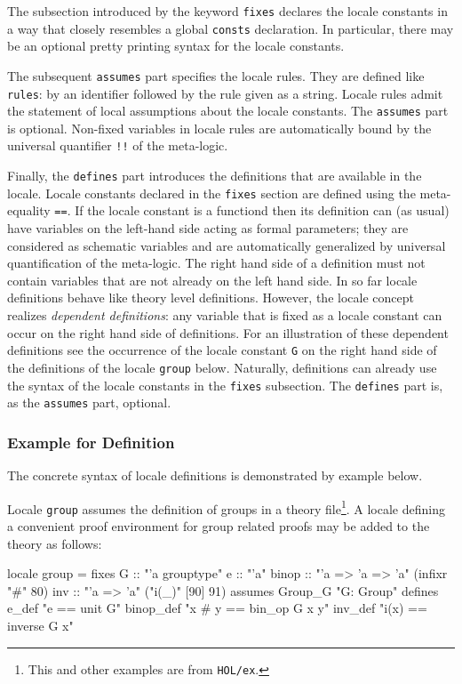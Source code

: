 The subsection introduced by the keyword \texttt{fixes} declares the locale
constants in a way that closely resembles a global \texttt{consts}
declaration.  In particular, there may be an optional pretty printing syntax
for the locale constants.

The subsequent \texttt{assumes} part specifies the locale rules.  They are
defined like \texttt{rules}: by an identifier followed by the rule
given as a string.  Locale rules admit the statement of local assumptions
about the locale constants.  The \texttt{assumes} part is optional.  Non-fixed
variables in locale rules are automatically bound by the universal quantifier
\texttt{!!} of the meta-logic.

Finally, the \texttt{defines} part introduces the definitions that are
available in the locale.  Locale constants declared in the \texttt{fixes}
section are defined using the meta-equality \texttt{==}.  If the
locale constant is a functiond then its definition can (as usual) have
variables on the left-hand side acting as formal parameters; they are
considered as schematic variables and are automatically generalized by
universal quantification of the meta-logic.  The right hand side of a
definition must not contain variables that are not already on the left hand
side.  In so far locale definitions behave like theory level definitions.
However, the locale concept realizes \emph{dependent definitions}: any variable
that is fixed as a locale constant can occur on the right hand side of
definitions.  For an illustration of these dependent definitions see the
occurrence of the locale constant \texttt{G} on the right hand side of the
definitions of the locale \texttt{group} below.  Naturally, definitions can
already use the syntax of the locale constants in the \texttt{fixes}
subsection.  The \texttt{defines} part is, as the \texttt{assumes} part,
optional.

\subsubsection{Example for Definition}
The concrete syntax of locale definitions is demonstrated by example below.

Locale \texttt{group} assumes the definition of groups in a theory
file\footnote{This and other examples are from \texttt{HOL/ex}.}.  A locale
defining a convenient proof environment for group related proofs may be
added to the theory as follows:
\begin{ttbox}
  locale group =
    fixes 
      G         :: "'a grouptype"
      e         :: "'a"
      binop     :: "'a => 'a => 'a"        (infixr "#" 80)
      inv       :: "'a => 'a"              ("i(_)" [90] 91)
    assumes
      Group_G   "G: Group"
    defines
      e_def     "e == unit G"
      binop_def "x # y == bin_op G x y"
      inv_def   "i(x) == inverse G x"
\end{ttbox}

